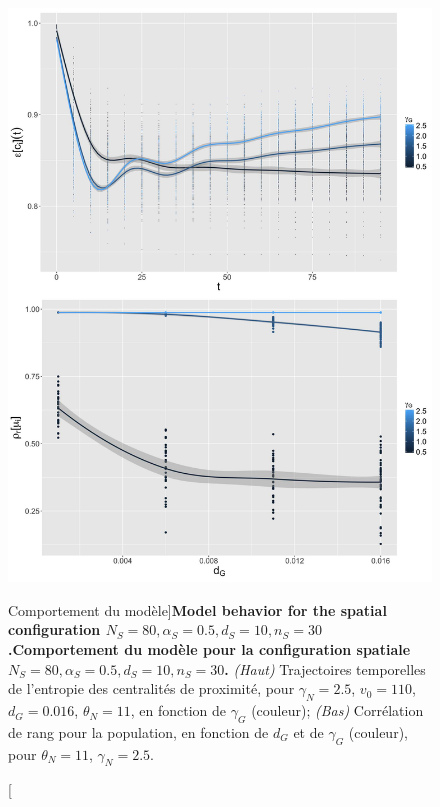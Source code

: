 \begin{figure}
	\includegraphics[width=\linewidth,height=0.85\textheight]{Figures/Final/6-1-3-fig-macrocoevolexplo-behavior.jpg}
	\caption[Model Behavior][Comportement du modèle]{\textbf{Model behavior for the spatial configuration $N_S=80,\alpha_S=0.5,d_S=10,n_S=30$.}\label{fig:macrocoevolexplo:behavior}}{\textbf{Comportement du modèle pour la configuration spatiale $N_S=80,\alpha_S=0.5,d_S=10,n_S=30$.} \textit{(Haut)} Trajectoires temporelles de l'entropie des centralités de proximité, pour $\gamma_N = 2.5$, $v_0 = 110$, $d_G = 0.016$, $\theta_N = 11$, en fonction de $\gamma_G$ (couleur); \textit{(Bas)} Corrélation de rang pour la population, en fonction de $d_G$ et de $\gamma_G$ (couleur), pour $\theta_N = 11$, $\gamma_N = 2.5$.\label{fig:macrocoevolexplo:behavior}}
\end{figure}




